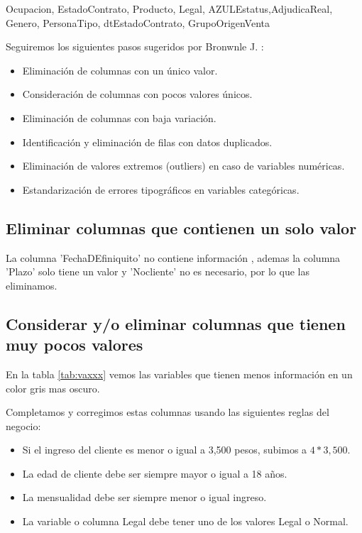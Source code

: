 Ocupacion, EstadoContrato, Producto, Legal, AZULEstatus,AdjudicaReal, Genero, PersonaTipo, dtEstadoContrato, GrupoOrigenVenta \medskip

Seguiremos los siguientes pasos sugeridos por Bronwnle J. \cite{Brown1} : \medskip
\begin{itemize}
    \item Eliminación de columnas con un único valor.
    \item Consideración de columnas con pocos valores únicos.
    \item Eliminación de columnas con baja variación.
    \item Identificación y eliminación de filas con datos duplicados.
    \item Eliminación de valores extremos (outliers) en caso de variables numéricas.
    \item Estandarización de errores tipográficos en variables categóricas.
\end{itemize}



\subsection{Eliminar columnas que contienen un solo valor} 

    La columna 'FechaDEfiniquito' no contiene información , ademas la columna 'Plazo' 
    solo tiene un valor y 'Nocliente' no es necesario, por lo que las eliminamos.
    

\subsection{ Considerar y/o eliminar columnas que tienen muy pocos valores}

En la tabla \ref{tab:vaxxx} vemos las variables que tienen menos información en un color gris mas oscuro. \medskip

Completamos y corregimos estas columnas usando las siguientes reglas del negocio: \medskip

\begin{itemize}
    \item Si el ingreso del cliente es menor o igual a 3,500 pesos, subimos a $ 4 * 3,500 $.
    \item La edad de cliente debe ser siempre mayor o igual a 18 años.
    \item La mensualidad debe ser siempre menor o igual ingreso.
    \item La variable o columna Legal debe tener uno de los valores Legal o Normal.
\end{itemize}

